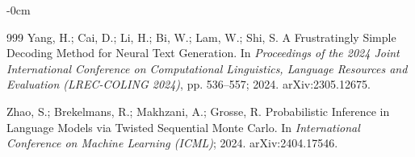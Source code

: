\documentclass[make,article,submit,pdftex]{Definitions/mdpi}
\begin{document}
\begin{adjustwidth}{-\extralength}{0cm}
\begin{thebibliography}{999}
Yang, H.; Cai, D.; Li, H.; Bi, W.; Lam, W.; Shi, S. A Frustratingly Simple Decoding Method for Neural Text Generation. In \textit{Proceedings of the 2024 Joint International Conference on Computational Linguistics, Language Resources and Evaluation (LREC-COLING 2024)}, pp. 536--557; 2024. arXiv:2305.12675.

Zhao, S.; Brekelmans, R.; Makhzani, A.; Grosse, R. Probabilistic Inference in Language Models via Twisted Sequential Monte Carlo. In \textit{International Conference on Machine Learning (ICML)}; 2024. arXiv:2404.17546.
\end{thebibliography}
\end{adjustwidth}
\end{document}
